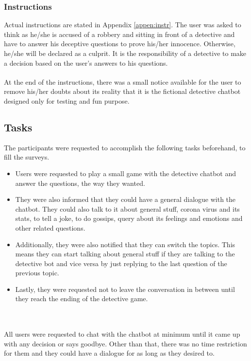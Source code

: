 \subsubsection*{Instructions}
Actual instructions are stated in Appendix \ref{appen:instr}. The user was asked to think as he/she is accused of a robbery and sitting in front of a detective and have to answer his deceptive questions to prove his/her innocence. Otherwise, he/she will be declared as a culprit. It is the responsibility of a detective to make a decision based on the user's answers to his questions.
\\~\\
At the end of the instructions, there was a small notice available for the user to remove his/her doubts about its reality that it is the fictional detective chatbot designed only for testing and fun purpose.

\subsection{Tasks}
The participants were requested to accomplish the following tasks beforehand, to fill the surveys.
\begin{itemize}
    \item Users were requested to play a small game with the detective chatbot and answer the questions, the way they wanted.
    \item They were also informed that they could have a general dialogue with the chatbot. They could also talk to it about general stuff, corona virus and its stats, to tell a joke, to do gossips, query about its feelings and emotions and other related questions.
    \item Additionally, they were also notified that they can switch the topics. This means they can start talking about general stuff if they are talking to the detective bot and vice versa by just replying to the last question of the previous topic.
    \item Lastly, they were requested not to leave the conversation in between until they reach the ending of the detective game. 
\end{itemize} 
\\~\\
All users were requested to chat with the chatbot at minimum until it came up with any decision or says goodbye. Other than that, there was no time restriction for them and they could have a dialogue for as long as they desired to.


